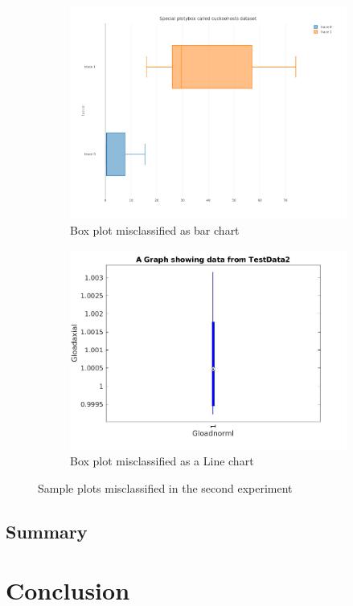 \documentclass[12pt, a4paper,oneside]{report}
\begin{document}
\begin{figure}[!htb]
	\begin{subfigure}{.6\textwidth}
		\centering
		\includegraphics[width=.8\linewidth]{missybar.png}
		\caption{Box plot misclassified as bar chart}
		\label{fig:mis1}
	\end{subfigure}%
	\begin{subfigure}{.5\textwidth}
		\centering
		\includegraphics[width=1.0\linewidth]{missyline.jpg}
		\caption{Box plot misclassified as a Line chart}
		\label{fig:mis2}
	\end{subfigure}
	\caption{Sample plots misclassified in the second experiment}
	\label{fig:missrand2}
\end{figure}

\section{Summary}

\chapter{Conclusion}



\end{document}
